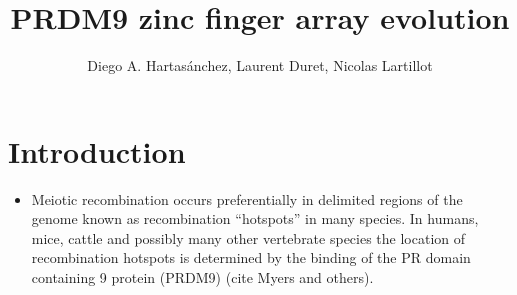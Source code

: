 \documentclass[a4paper,10pt]{article}
\title{PRDM9 zinc finger array evolution}
\author{Diego A. Hartasánchez, Laurent Duret, Nicolas Lartillot}
\begin{document}
\maketitle

\begin{abstract}

\end{abstract}


\section{Introduction}


\begin{itemize}

 \item Meiotic recombination occurs preferentially in delimited regions of the genome known as recombination ``hotspots'' in many species. In humans, mice, cattle and possibly many other vertebrate species \cite{Baker2017} the location of recombination hotspots is determined by the binding of the PR domain containing 9 protein (PRDM9) (cite Myers and others). 
 

\end{itemize}
\end{document}
